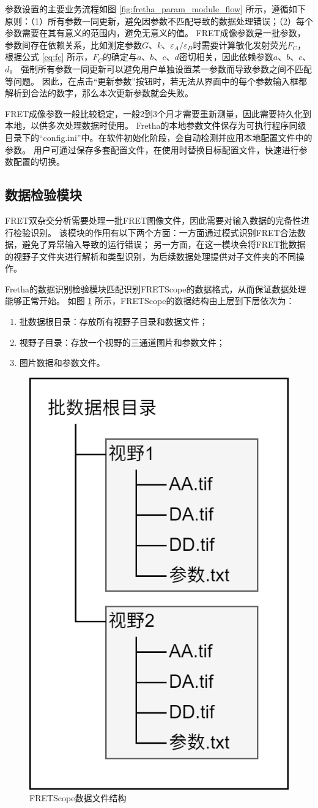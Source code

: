 参数设置的主要业务流程如图 \ref{fig:fretha_param_module_flow} 所示，遵循如下原则：（1）所有参数一同更新，避免因参数不匹配导致的数据处理错误；（2）每个参数需要在其有意义的范围内，避免无意义的值。
FRET成像参数是一批参数，参数间存在依赖关系，比如测定参数$G$、$k$、$\varepsilon_{A}/\varepsilon_{D}$时需要计算敏化发射荧光$F_C$，根据公式 \ref{eq:fc} 所示，$F_C$的确定与$a$、$b$、$c$、$d$密切相关，因此依赖参数$a$、$b$、$c$、$d$。
强制所有参数一同更新可以避免用户单独设置某一参数而导致参数之间不匹配等问题。
因此，在点击“更新参数”按钮时，若无法从界面中的每个参数输入框都解析到合法的数字，那么本次更新参数就会失败。

FRET成像参数一般比较稳定，一般2到3个月才需要重新测量，因此需要持久化到本地，以供多次处理数据时使用。
Fretha的本地参数文件保存为可执行程序同级目录下的“config.ini”中。在软件初始化阶段，会自动检测并应用本地配置文件中的参数。
用户可通过保存多套配置文件，在使用时替换目标配置文件，快速进行参数配置的切换。
\fi

\subsection{数据检验模块}
\label{sec:数据检验模块}

FRET双杂交分析需要处理一批FRET图像文件，因此需要对输入数据的完备性进行检验识别。
该模块的作用有以下两个方面：一方面通过模式识别FRET合法数据，避免了异常输入导致的运行错误；
另一方面，在这一模块会将FRET批数据的视野子文件夹进行解析和类型识别，为后续数据处理提供对子文件夹的不同操作。

Fretha的数据识别检验模块匹配识别FRETScope的数据格式，从而保证数据处理能够正常开始。
如图 \ref{fig:fretscope_data_struct} 所示，FRETScope的数据结构由上层到下层依次为：
\begin{enumerate}
  \item 批数据根目录：存放所有视野子目录和数据文件；
  \item 视野子目录：存放一个视野的三通道图片和参数文件；
  \item 图片数据和参数文件。
\end{enumerate}

\begin{figure}[htbp]
    \centering
    \includegraphics[height=0.5\linewidth]{../figures/2/2_FRETScopeII数据格式.drawio.png}
    \caption{FRETScope数据文件结构}
    \label{fig:fretscope_data_struct}
\end{figure}

